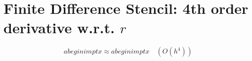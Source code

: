 \documentclass{article}
\begin{document}
\section*{Finite Difference Stencil: 4th order derivative w.r.t. $r$}


\[
a begin i m p t x \approx a begin i m p t x \quad (O(h^4))
\]
\end{document}
